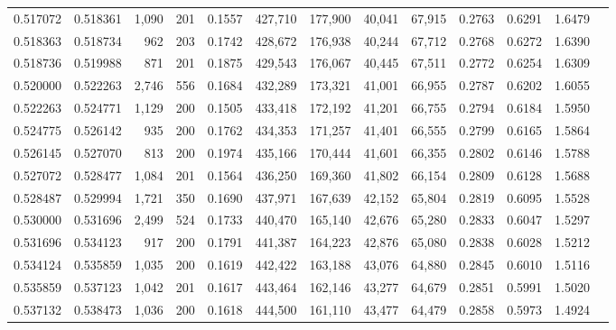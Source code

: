 \begin{tabular}{rrrrrrrrrrrrr}
0.517072 & 0.518361 & 1,090 & 201 &                                     0.1557 & 427,710 & 177,900 &  40,041 &  67,915 & 0.2763 & 0.6291 & 1.6479 \\
0.518363 & 0.518734 &   962 & 203 &                                     0.1742 & 428,672 & 176,938 &  40,244 &  67,712 & 0.2768 & 0.6272 & 1.6390 \\
0.518736 & 0.519988 &   871 & 201 &                                     0.1875 & 429,543 & 176,067 &  40,445 &  67,511 & 0.2772 & 0.6254 & 1.6309 \\
0.520000 & 0.522263 & 2,746 & 556 &                                     0.1684 & 432,289 & 173,321 &  41,001 &  66,955 & 0.2787 & 0.6202 & 1.6055 \\
0.522263 & 0.524771 & 1,129 & 200 &                                     0.1505 & 433,418 & 172,192 &  41,201 &  66,755 & 0.2794 & 0.6184 & 1.5950 \\
0.524775 & 0.526142 &   935 & 200 &                                     0.1762 & 434,353 & 171,257 &  41,401 &  66,555 & 0.2799 & 0.6165 & 1.5864 \\
0.526145 & 0.527070 &   813 & 200 &                                     0.1974 & 435,166 & 170,444 &  41,601 &  66,355 & 0.2802 & 0.6146 & 1.5788 \\
0.527072 & 0.528477 & 1,084 & 201 &                                     0.1564 & 436,250 & 169,360 &  41,802 &  66,154 & 0.2809 & 0.6128 & 1.5688 \\
0.528487 & 0.529994 & 1,721 & 350 &                                     0.1690 & 437,971 & 167,639 &  42,152 &  65,804 & 0.2819 & 0.6095 & 1.5528 \\
0.530000 & 0.531696 & 2,499 & 524 &                                     0.1733 & 440,470 & 165,140 &  42,676 &  65,280 & 0.2833 & 0.6047 & 1.5297 \\
0.531696 & 0.534123 &   917 & 200 &                                     0.1791 & 441,387 & 164,223 &  42,876 &  65,080 & 0.2838 & 0.6028 & 1.5212 \\
0.534124 & 0.535859 & 1,035 & 200 &                                     0.1619 & 442,422 & 163,188 &  43,076 &  64,880 & 0.2845 & 0.6010 & 1.5116 \\
0.535859 & 0.537123 & 1,042 & 201 &                                     0.1617 & 443,464 & 162,146 &  43,277 &  64,679 & 0.2851 & 0.5991 & 1.5020 \\
0.537132 & 0.538473 & 1,036 & 200 &                                     0.1618 & 444,500 & 161,110 &  43,477 &  64,479 & 0.2858 & 0.5973 & 1.4924 \\

\end{tabular}
